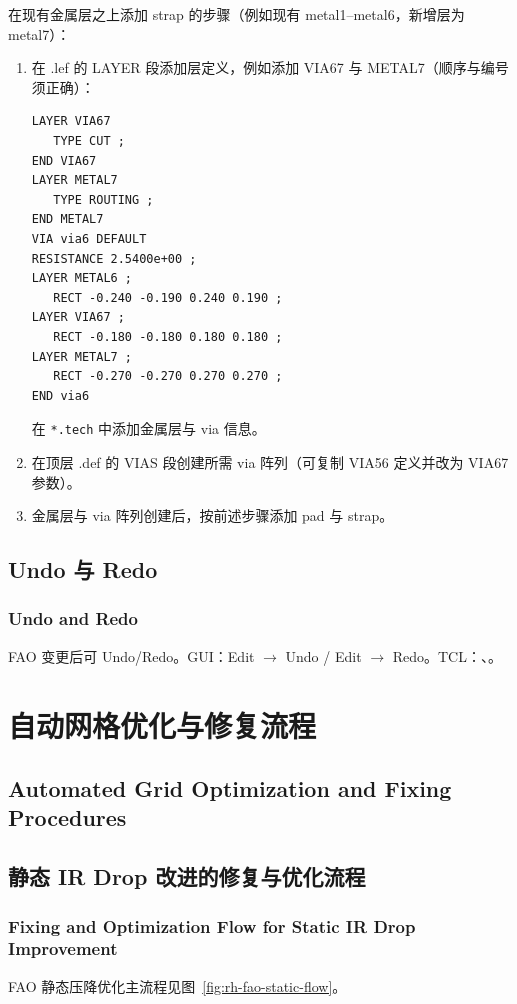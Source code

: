 在现有金属层之上添加 strap 的步骤（例如现有 metal1--metal6，新增层为 metal7）：

\begin{enumerate}
  \item 在 .lef 的 LAYER 段添加层定义，例如添加 VIA67 与 METAL7（顺序与编号须正确）：
\begin{lstlisting}
LAYER VIA67
   TYPE CUT ;
END VIA67
LAYER METAL7
   TYPE ROUTING ;
END METAL7
VIA via6 DEFAULT
RESISTANCE 2.5400e+00 ;
LAYER METAL6 ;
   RECT -0.240 -0.190 0.240 0.190 ;
LAYER VIA67 ;
   RECT -0.180 -0.180 0.180 0.180 ;
LAYER METAL7 ;
   RECT -0.270 -0.270 0.270 0.270 ;
END via6
\end{lstlisting}
  在 \texttt{*.tech} 中添加金属层与 via 信息。
  \item 在顶层 .def 的 VIAS 段创建所需 via 阵列（可复制 VIA56 定义并改为 VIA67 参数）。
  \item 金属层与 via 阵列创建后，按前述步骤添加 pad 与 strap。
\end{enumerate}

\subsection{Undo 与 Redo}
\subsubsection*{Undo and Redo}

FAO 变更后可 Undo/Redo。GUI：Edit $\rightarrow$ Undo / Edit $\rightarrow$ Redo。TCL：、。

\section{自动网格优化与修复流程}
\subsection*{Automated Grid Optimization and Fixing Procedures}

\subsection{静态 IR Drop 改进的修复与优化流程}
\subsubsection*{Fixing and Optimization Flow for Static IR Drop Improvement}

FAO 静态压降优化主流程见图~\ref{fig:rh-fao-static-flow}。

